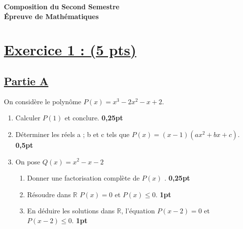 \documentclass[12pt,a4paper]{article}
\begin{document}
\begin{center}
    \Large\textbf{Composition du Second Semestre} \\
    \large\textbf{Épreuve de Mathématiques}
\end{center}

\vspace{0.5cm}
\section*{\underline{Exercice 1 : (5 pts)}}
\subsection*{\underline{Partie A}}
On considère le polynôme $P(x) = x^3 - 2x^2 - x + 2$.

\begin{enumerate}
    \item Calculer $P(1)$ et conclure. \hfill \textbf{0,25pt}
    
    \item Déterminer les réels a ; b et c tels que $P(x) = (x - 1)(ax^2 + bx + c)$. \hfill \textbf{0,5pt}
    
    \item On pose $Q(x) = x^2 - x - 2$
    \begin{enumerate}
        \item Donner une factorisation complète de $P(x)$ . \hfill \textbf{0,25pt}
        \item Résoudre dans $\mathbb{R}$  $P(x) = 0$ et $P(x) \leq 0$. \hfill \textbf{1pt}
        \item En déduire les solutions dans $\mathbb{R}$, l'équation $P(x-2) = 0$ et $P(x-2) \leq 0$. \hfill \textbf{1pt}
    \end{enumerate}
\end{enumerate}
\end{document}
